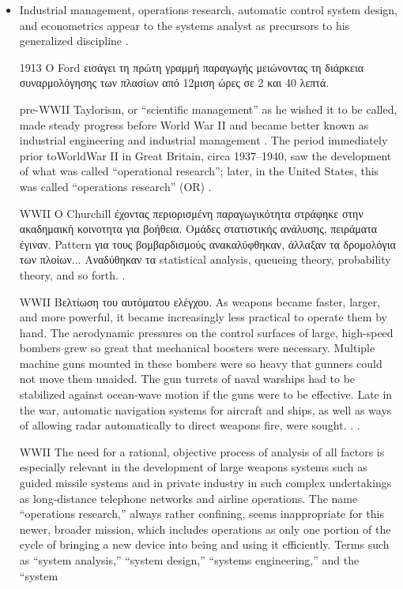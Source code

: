 \documentclass[a4paper,12pt,twoside]{report}
\begin{document}
{\begin{itemize}
				\item Industrial management, operations research, automatic control system design, and econometrics appear to the systems analyst as precursors to his generalized discipline \cite[page 15]{HowToDoSystemAnalysis:Gibson2007}.
				\item [1913] Ο Ford εισάγει τη πρώτη γραμμή παραγωγής μειώνοντας τη διάρκεια συναρμολόγησης των πλασίων από 12μιση ώρες σε 2 και 40 λεπτά.
				\item [pre-WWII] Taylorism, or “scientific management” as he wished it to be called, made steady progress before World War II and became better known as industrial engineering and industrial management \cite[page 15]{HowToDoSystemAnalysis:Gibson2007}. The period immediately prior toWorldWar II in Great Britain, circa 1937–1940, saw
the development of what was called “operational research”; later, in the United States,
this was called “operations research” (OR) \cite[15]{HowToDoSystemAnalysis:Gibson2007}.
				\item [WWII] Ο Churchill έχοντας περιορισμένη παραγωγικότητα στράφηκε στην ακαδημαική κοινοτητα για βοήθεια. Ομάδες στατιστικής ανάλυσης, πειράματα έγιναν. Pattern για τους βομβαρδισμούς ανακαλύφθηκαν, άλλαξαν τα δρομολόγια των πλοίων... Αναδύθηκαν τα statistical analysis, queueing theory, probability theory, and so forth. \cite[15]{HowToDoSystemAnalysis:Gibson2007}.
				\item [WWII] Βελτίωση του αυτόματου ελέγχου. As weapons became faster, larger,
and more powerful, it became increasingly less practical to operate them by hand. The
aerodynamic pressures on the control surfaces of large, high-speed bombers grew so
great that mechanical boosters were necessary. Multiple machine guns mounted in
these bombers were so heavy that gunners could not move them unaided. The gun
turrets of naval warships had to be stabilized against ocean-wave motion if the guns
were to be effective. Late in the war, automatic navigation systems for aircraft and
ships, as well as ways of allowing radar automatically to direct weapons fire, were
sought. \cite[page 15]{HowToDoSystemAnalysis:Gibson2007}.
				.
				\item [WWII] The need for a rational, objective process of analysis of all factors is especially relevant in the development of large weapons systems such as guided missile systems and in private industry in such complex undertakings as long-distance telephone networks and airline operations. The name “operations research,” always rather confining, seems inappropriate for this newer, broader mission, which includes operations as only one portion of the cycle of bringing a new device into being and using it efficiently. Terms such as “system analysis,” “system design,” “systems engineering,” and the “system

\end{itemize}}
\end{document}
